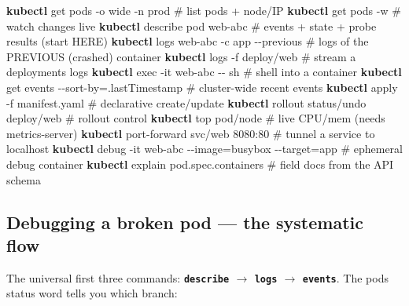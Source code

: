 \documentclass[11pt]{article}
\newenvironment{Shaded}{\begin{snugshade}}{\end{snugshade}}
\newcommand{\AttributeTok}[1]{\textcolor[rgb]{0.16,0.50,0.73}{#1}}
\newcommand{\CommentTok}[1]{\textcolor[rgb]{0.48,0.49,0.49}{#1}}
\newcommand{\ExtensionTok}[1]{\textcolor[rgb]{0.00,0.60,1.00}{\textbf{#1}}}
\newcommand{\NormalTok}[1]{\textcolor[rgb]{0.81,0.81,0.76}{#1}}
\newcommand{\OperatorTok}[1]{\textcolor[rgb]{0.81,0.81,0.76}{#1}}
\begin{document}

\begin{Shaded}
\begin{Highlighting}[]
\ExtensionTok{kubectl}\NormalTok{ get pods }\AttributeTok{{-}o}\NormalTok{ wide }\AttributeTok{{-}n}\NormalTok{ prod            }\CommentTok{\# list pods + node/IP}
\ExtensionTok{kubectl}\NormalTok{ get pods }\AttributeTok{{-}w}                         \CommentTok{\# watch changes live}
\ExtensionTok{kubectl}\NormalTok{ describe pod web{-}abc                }\CommentTok{\# events + state + probe results (start HERE)}
\ExtensionTok{kubectl}\NormalTok{ logs web{-}abc }\AttributeTok{{-}c}\NormalTok{ app }\AttributeTok{{-}{-}previous}      \CommentTok{\# logs of the PREVIOUS (crashed) container}
\ExtensionTok{kubectl}\NormalTok{ logs }\AttributeTok{{-}f}\NormalTok{ deploy/web                  }\CommentTok{\# stream a deployment\textquotesingle{}s logs}
\ExtensionTok{kubectl}\NormalTok{ exec }\AttributeTok{{-}it}\NormalTok{ web{-}abc }\AttributeTok{{-}{-}}\NormalTok{ sh              }\CommentTok{\# shell into a container}
\ExtensionTok{kubectl}\NormalTok{ get events }\AttributeTok{{-}{-}sort{-}by}\OperatorTok{=}\NormalTok{.lastTimestamp }\CommentTok{\# cluster{-}wide recent events}
\ExtensionTok{kubectl}\NormalTok{ apply }\AttributeTok{{-}f}\NormalTok{ manifest.yaml              }\CommentTok{\# declarative create/update}
\ExtensionTok{kubectl}\NormalTok{ rollout status/undo deploy/web      }\CommentTok{\# rollout control}
\ExtensionTok{kubectl}\NormalTok{ top pod/node                        }\CommentTok{\# live CPU/mem (needs metrics{-}server)}
\ExtensionTok{kubectl}\NormalTok{ port{-}forward svc/web 8080:80        }\CommentTok{\# tunnel a service to localhost}
\ExtensionTok{kubectl}\NormalTok{ debug }\AttributeTok{{-}it}\NormalTok{ web{-}abc }\AttributeTok{{-}{-}image}\OperatorTok{=}\NormalTok{busybox }\AttributeTok{{-}{-}target}\OperatorTok{=}\NormalTok{app   }\CommentTok{\# ephemeral debug container}
\ExtensionTok{kubectl}\NormalTok{ explain pod.spec.containers         }\CommentTok{\# field docs from the API schema}
\end{Highlighting}
\end{Shaded}

\subsection{Debugging a broken pod --- the systematic flow}\label{debugging-a-broken-pod--the-systematic-flow}

The universal first three commands: \textbf{\texttt{describe} \(\rightarrow\) \texttt{logs} \(\rightarrow\) \texttt{events}}. The pod\textquotesingle s status word tells you which branch:
\end{document}
